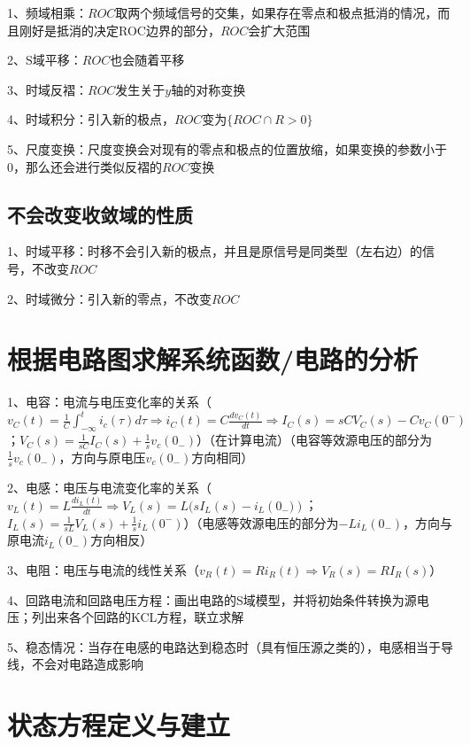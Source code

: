 1、频域相乘：$ROC$取两个频域信号的交集，如果存在零点和极点抵消的情况，而且刚好是抵消的决定ROC边界的部分，$ROC$会扩大范围

2、S域平移：$ROC$也会随着平移

3、时域反褶：$ROC$发生关于$y$轴的对称变换

4、时域积分：引入新的极点，$ROC$变为$\{ ROC \cap R \gt 0 \}$

5、尺度变换：尺度变换会对现有的零点和极点的位置放缩，如果变换的参数小于0，那么还会进行类似反褶的$ROC$变换



\subsection{不会改变收敛域的性质}

1、时域平移：时移不会引入新的极点，并且是原信号是同类型（左右边）的信号，不改变$ROC$

2、时域微分：引入新的零点，不改变$ROC$

\section{根据电路图求解系统函数/电路的分析}

1、电容：电流与电压变化率的关系（$v_{C}(t)=\frac{1}{C} \int_{-\infty}^{t} i_{c}(\tau) d \tau \Rightarrow i_{C}(t)=C \frac{d v_{C}(t)}{d t} \Rightarrow I_{C}(s)=s C V_{C}(s)-C v_{C}\left(0^{-}\right)$；$ V_{C}(s)=\frac{1}{s C} I_{C}(s)+\frac{1}{s} v_{c}\left(0_{-}\right)$）（在计算电流）（电容等效源电压的部分为$\frac{1}{s} v_{c}\left(0_{-}\right)$，方向与原电压$v_{c}\left(0_{-}\right)$方向相同）

2、电感：电压与电流变化率的关系（$v_{L}(t)=L \frac{d i_{L}(t)}{d t} \Rightarrow V_{L}(s)=L (s I_{L}(s)- i_{L}\left(0_{-})\right)$；$I_{L}(s)=\frac{1}{s L} V_{L}(s)+\frac{1}{s} i_{L}\left(0^{-}\right)$）（电感等效源电压的部分为$- L i_{L}\left(0_{-}\right)$，方向与原电流$i_{L}\left(0_{-}\right)$方向相反）

3、电阻：电压与电流的线性关系（$v_{R}(t)=R i_{R}(t)\Rightarrow V_{R}(s)=R I_{R}(s)$）

4、回路电流和回路电压方程：画出电路的S域模型，并将初始条件转换为源电压；列出来各个回路的KCL方程，联立求解

5、稳态情况：当存在电感的电路达到稳态时（具有恒压源之类的），电感相当于导线，不会对电路造成影响

\section{状态方程定义与建立}



